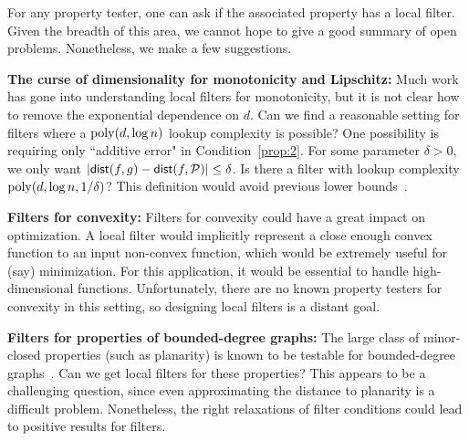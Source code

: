 \documentclass[natbib]{svcyclop}
\def\dist{{\sf dist}}
\begin{document}
\OpenProb

For any property tester, one can ask if the associated property has a local filter.
Given the breadth of this area, we cannot hope to give a good summary of open problems. Nonetheless,
we make a few suggestions.

{\bf The curse of dimensionality for monotonicity and Lipschitz:} Much work has gone into understanding local filters
for monotonicity, but it is not clear how to remove the exponential dependence on $d$.
Can we find a reasonable setting for filters where a $\mathrm{poly}(d,\log n)$ lookup complexity is possible? One possibility is requiring only ``additive error" in Condition~\ref{prop:2}.
For some parameter $\delta > 0$, we only want $|\dist(f,g) - \dist(f,\cP)| \leq \delta$. Is there a filter
with lookup complexity $\mathrm{poly}(d,\log n,1/\delta)$? This definition would avoid previous lower bounds~\cite{AwJh+12}.
%
%

{\bf Filters for convexity:} Filters for convexity could have a great impact on optimization.
A local filter would implicitly represent a close enough convex function to an input non-convex function,
which would be extremely useful for (say) minimization. For this application, it would be essential
to handle high-dimensional functions. Unfortunately, there are no known property testers for convexity in this setting,
so designing local filters is a distant goal.

{\bf Filters for properties of bounded-degree graphs:} The large class of minor-closed properties (such as planarity)
is known to be testable for bounded-degree graphs~\cite{BSS08}. Can we get local filters for these properties? This appears to 
be a challenging question, since even approximating the distance to planarity is a difficult problem.
Nonetheless, the right relaxations of filter conditions could lead to positive results for filters.



%
%
%
%
\end{document}
